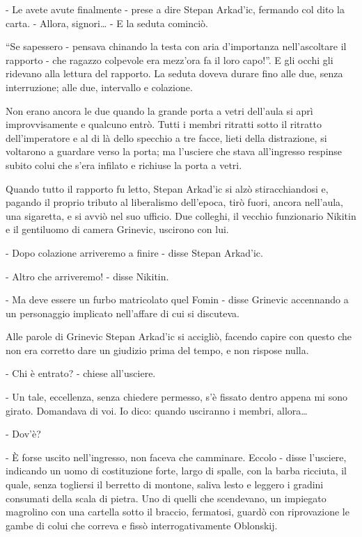 - Le avete avute finalmente - prese a dire Stepan Arkad'ic, fermando col dito la carta. - Allora, signori\ldots{} - E la seduta cominciò. 

``Se sapessero - pensava chinando la testa con aria d'importanza nell'ascoltare il rapporto - che ragazzo colpevole era mezz'ora fa il loro capo!''. E gli occhi gli ridevano alla lettura del rapporto. La seduta doveva durare fino alle due, senza interruzione; alle due, intervallo e colazione. 

Non erano ancora le due quando la grande porta a vetri dell'aula si aprì improvvisamente e qualcuno entrò. Tutti i membri ritratti sotto il ritratto dell'imperatore e al di là dello specchio a tre facce, lieti della distrazione, si voltarono a guardare verso la porta; ma l'usciere che stava all'ingresso respinse subito colui che s'era infilato e richiuse la porta a vetri. 

Quando tutto il rapporto fu letto, Stepan Arkad'ic si alzò stiracchiandosi e, pagando il proprio tributo al liberalismo dell'epoca, tirò fuori, ancora nell'aula, una sigaretta, e si avviò nel suo ufficio. Due colleghi, il vecchio funzionario Nikitin e il gentiluomo di camera Grinevic, uscirono con lui. 

- Dopo colazione arriveremo a finire - disse Stepan Arkad'ic. 

- Altro che arriveremo! - disse Nikitin. 

- Ma deve essere un furbo matricolato quel Fomin - disse Grinevic accennando a un personaggio implicato nell'affare di cui si discuteva. 

Alle parole di Grinevic Stepan Arkad'ic si accigliò, facendo capire con questo che non era corretto dare un giudizio prima del tempo, e non rispose nulla. 

- Chi è entrato? - chiese all'usciere. 

- Un tale, eccellenza, senza chiedere permesso, s'è fissato dentro appena mi sono girato. Domandava di voi. Io dico: quando usciranno i membri, allora\ldots{} 

- Dov'è? 

- È forse uscito nell'ingresso, non faceva che camminare. Eccolo - disse l'usciere, indicando un uomo di costituzione forte, largo di spalle, con la barba ricciuta, il quale, senza togliersi il berretto di montone, saliva lesto e leggero i gradini consumati della scala di pietra. Uno di quelli che scendevano, un impiegato magrolino con una cartella sotto il braccio, fermatosi, guardò con riprovazione le gambe di colui che correva e fissò interrogativamente Oblonskij. 


